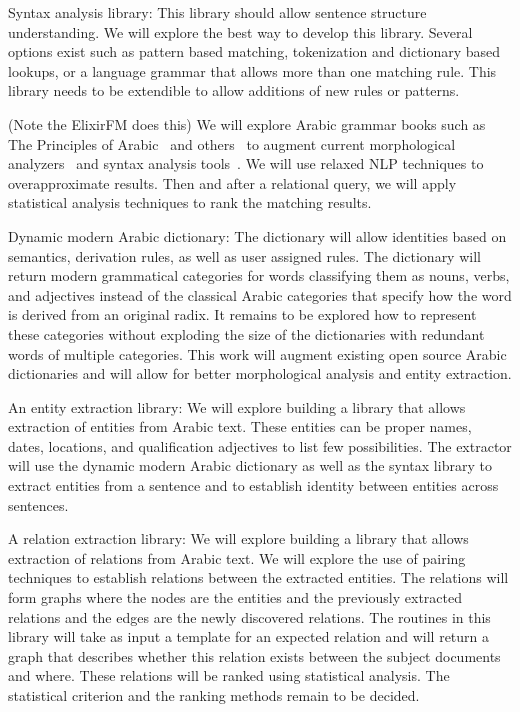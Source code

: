 \documentclass[12pt]{article}
\begin{document}
Syntax analysis library: This library should allow sentence structure understanding.
 We will explore the best way to develop this library.
 Several options exist such as pattern based matching,
 tokenization and dictionary based lookups,
 or a language grammar that allows more than one matching rule.
 This library needs to be extendible to allow additions of new rules or patterns.

 (Note the ElixirFM does this)
 We will explore Arabic grammar books such as The Principles of Arabic~\cite{Sha73} and others~\cite{Abd00,Abd001}
 to augment current morphological analyzers~\cite{Tim04} and syntax analysis tools~\cite{Col09}.
 We will use relaxed NLP techniques to overapproximate results.
 Then and after a relational query,
 we will apply statistical analysis techniques to rank the matching results.

Dynamic modern Arabic dictionary: The dictionary will allow identities based on semantics,
 derivation rules,
 as well as user assigned rules.
 The dictionary will return modern grammatical categories for words classifying them as nouns,
 verbs,
 and adjectives instead of the classical Arabic categories that specify how the word is derived from an original radix.
 It remains to be explored how to represent these categories without exploding the size of the dictionaries with redundant words of multiple categories.
 This work will augment existing open source Arabic dictionaries and will allow for better morphological analysis and entity extraction.

An entity extraction library: We will explore building a library that allows extraction of entities from Arabic text.
 These entities can be proper names,
 dates,
 locations,
 and qualification adjectives to list few possibilities.
 The extractor will use the dynamic modern Arabic dictionary as well as the syntax library to extract entities from a sentence and to establish identity between entities across sentences.

A relation extraction library: We will explore building a library that allows extraction of relations from Arabic text.
 We will explore the use of pairing techniques to establish relations between the extracted entities.
 The relations will form graphs where the nodes are the entities and the previously extracted relations and the edges are the newly discovered relations.
 The routines in this library will take as input a template for an expected relation and will return a graph that describes whether this relation exists between the subject documents and where.
 These relations will be ranked using statistical analysis.
 The statistical criterion and the ranking methods remain to be decided.
\end{document}
